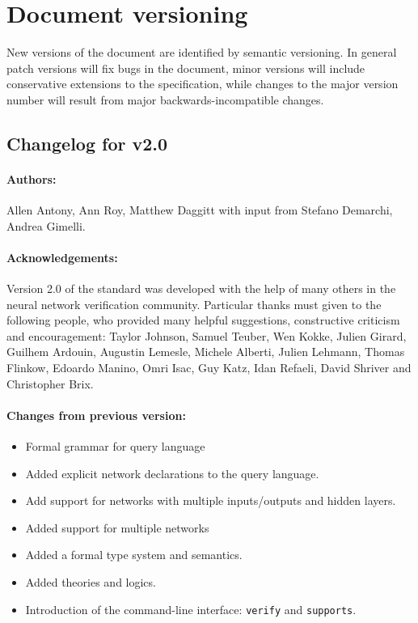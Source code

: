 \section{Document versioning}

New versions of the document are identified by semantic versioning. In general patch versions will fix bugs in the document, minor versions will include conservative extensions to the specification, while changes to the major version number will result from major backwards-incompatible changes.

\subsection*{Changelog for v2.0}

\paragraph{Authors:} Allen Antony, Ann Roy, Matthew Daggitt with input from Stefano Demarchi, Andrea Gimelli.

\noindent \paragraph{Acknowledgements:} Version 2.0 of the standard was developed with the help of many others in the neural network verification community.
Particular thanks must given to the following people, who provided many helpful suggestions, constructive criticism and encouragement: Taylor Johnson, Samuel Teuber, Wen Kokke, Julien Girard, Guilhem Ardouin, Augustin Lemesle, Michele Alberti, Julien Lehmann, Thomas Flinkow, Edoardo Manino, Omri Isac, Guy Katz, Idan Refaeli, David Shriver and Christopher Brix.

\noindent \paragraph{Changes from previous version:}
\begin{itemize}
\item Formal grammar for query language
\item Added explicit network declarations to the query language.
\item Add support for networks with multiple inputs/outputs and hidden layers.
\item Added support for multiple networks
\item Added a formal type system and semantics.
\item Added theories and logics.
\item Introduction of the command-line interface: \texttt{verify} and \texttt{supports}.
\end{itemize}

